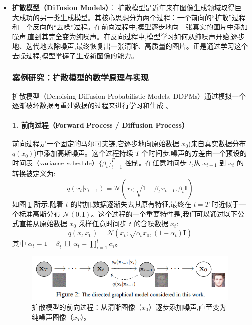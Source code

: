 \begin{itemize}
    \item \textbf{扩散模型（Diffusion Models）：} 扩散模型是近年来在图像生成领域取得巨大成功的另一类生成模型。其核心思想分为两个过程：一个前向的“扩散”过程和一个反向的“去噪”过程。在前向过程中,模型逐步地向一张真实的图片中添加噪声,直到其完全变为纯噪声。在反向过程中,模型学习如何从纯噪声开始,逐步地、迭代地去除噪声,最终恢复出一张清晰、高质量的图片。正是通过学习这个去噪过程,模型掌握了生成新图像的能力。

    \subsubsection*{案例研究：扩散模型的数学原理与实现}
    \label{sssec:diffusion_case_study}
    扩散模型（Denoising Diffusion Probabilistic Models, DDPMs）通过模拟一个逐渐破坏数据再重建数据的过程来进行学习和生成 \cite{croitoru2023diffusion}。

    \paragraph{1. 前向过程（Forward Process / Diffusion Process）}
    前向过程是一个固定的马尔可夫链,它逐步地向原始数据 $x_0$(来自真实数据分布 $q(x_0)$)中添加高斯噪声。这个过程持续 $T$ 个时间步,噪声的方差由一个预设的时间表（variance schedule）$\{\beta_t\}_{t=1}^T$ 控制。在任意时间步 $t$,从 $x_{t-1}$ 到 $x_t$ 的转换被定义为:
    $$ q(x_t | x_{t-1}) = \mathcal{N}(x_t; \sqrt{1 - \beta_t} x_{t-1}, \beta_t \mathbf{I}) $$
    如图 \ref{fig:diffusion_forward_process} 所示,随着 $t$ 的增加,数据逐渐失去其原有特征,最终在 $t=T$ 时近似于一个标准高斯分布 $\mathcal{N}(0, \mathbf{I})$。这个过程的一个重要特性是,我们可以通过以下公式直接从原始数据 $x_0$ 采样任意时间步 $t$ 的含噪数据 $x_t$:
    $$ q(x_t | x_0) = \mathcal{N}(x_t; \sqrt{\bar{\alpha}_t} x_0, (1 - \bar{\alpha}_t) \mathbf{I}) $$
    其中 $\alpha_t = 1 - \beta_t$ 且 $\bar{\alpha}_t = \prod_{i=1}^t \alpha_i$。

    \begin{figure}[htbp]
        \centering
        \includegraphics[width=\textwidth]{figures/D1.png}
        \caption{扩散模型的前向过程：从清晰图像（$x_0$）逐步添加噪声,直至变为纯噪声图像（$x_T$）。}
        \label{fig:diffusion_forward_process}
    \end{figure}


\end{itemize}
